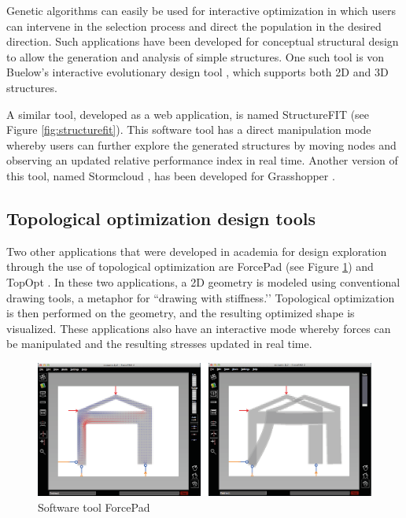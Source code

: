 Genetic algorithms can easily be used for interactive optimization in which users can intervene in the selection process and direct the population in the desired direction. Such applications have been developed for conceptual structural design to allow the generation and analysis of simple structures. One such tool is von Buelow’s interactive evolutionary design tool \cite{VonBuelow2008}, which supports both 2D and 3D structures.

A similar tool, developed as a web application, is named StructureFIT \cite{Mueller2013, Mueller2015} (see Figure \ref{fig:structurefit}). This software tool has a direct manipulation mode whereby users can further explore the generated structures by moving nodes and observing an updated relative performance index in real time. Another version of this tool, named Stormcloud \cite{Danhaive2015}, has been developed for Grasshopper \cite{Grasshopper}.

\subsection{Topological optimization design tools}
Two other applications that were developed in academia for design exploration through the use of topological optimization are ForcePad \cite{Lindemann2004} (see Figure \ref{fig:forcepad}) and TopOpt \cite{Aage2013}. In these two applications, a 2D geometry is modeled using conventional drawing tools, a metaphor for ``drawing with stiffness.’’ Topological optimization is then performed on the geometry, and the resulting optimized shape is visualized. These applications also have an interactive mode whereby forces can be manipulated and the resulting stresses updated in real time.

\begin{figure}
  \includegraphics[width=350pt]{graphics/forcepad.png}
  \caption{Software tool ForcePad}
  \label{fig:forcepad}
\end{figure}

